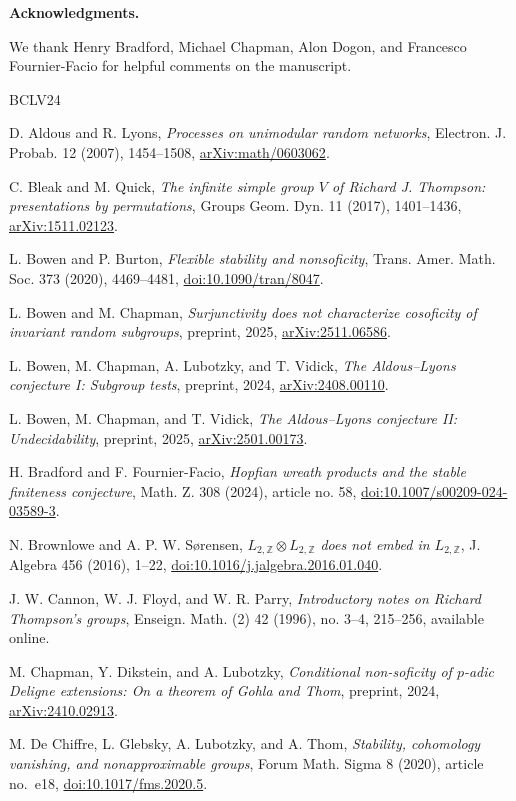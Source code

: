 \documentclass[10pt]{article}
\newcommand{\Z}{\mathbb{Z}}
\newcommand{\subhead}[1]{\par\medskip\noindent\textbf{#1}\par\smallskip}
\begin{document}
\subhead{Acknowledgments.}
We thank Henry Bradford, Michael Chapman, Alon Dogon, and Francesco Fournier-Facio for helpful comments on the manuscript.

\begin{thebibliography}{BCLV24}

D. Aldous and R. Lyons, \emph{Processes on unimodular random networks}, Electron. J. Probab. 12 (2007), 1454--1508, \url{arXiv:math/0603062}.

C. Bleak and M. Quick, \emph{The infinite simple group $V$ of Richard J. Thompson: presentations by permutations}, Groups Geom. Dyn. 11 (2017), 1401--1436, \url{arXiv:1511.02123}.

L. Bowen and P. Burton, \emph{Flexible stability and nonsoficity}, Trans. Amer. Math. Soc. 373 (2020), 4469--4481, \url{doi:10.1090/tran/8047}.

L. Bowen and M. Chapman, \emph{Surjunctivity does not characterize cosoficity of invariant random subgroups}, preprint, 2025, \url{arXiv:2511.06586}.

L. Bowen, M. Chapman, A. Lubotzky, and T. Vidick, \emph{The Aldous--Lyons conjecture I: Subgroup tests}, preprint, 2024, \url{arXiv:2408.00110}.

L. Bowen, M. Chapman, and T. Vidick, \emph{The Aldous--Lyons conjecture II: Undecidability}, preprint, 2025, \url{arXiv:2501.00173}.

H. Bradford and F. Fournier-Facio, \emph{Hopfian wreath products and the stable finiteness conjecture}, Math. Z. 308 (2024), article no. 58, \url{doi:10.1007/s00209-024-03589-3}.

N. Brownlowe and A. P. W. Sørensen, \emph{$L_{2,\Z}\otimes L_{2,\Z}$ does not embed in $L_{2,\Z}$}, J. Algebra 456 (2016), 1--22, \url{doi:10.1016/j.jalgebra.2016.01.040}.

J. W. Cannon, W. J. Floyd, and W. R. Parry, \emph{Introductory notes on Richard Thompson's groups}, Enseign. Math. (2) 42 (1996), no. 3--4, 215--256, available online.

M. Chapman, Y. Dikstein, and A. Lubotzky, \emph{Conditional non-soficity of $p$-adic Deligne extensions: On a theorem of Gohla and Thom}, preprint, 2024, \url{arXiv:2410.02913}.

M. De Chiffre, L. Glebsky, A. Lubotzky, and A. Thom, \emph{Stability, cohomology vanishing, and nonapproximable groups}, Forum Math. Sigma 8 (2020), article no.~e18, \url{doi:10.1017/fms.2020.5}.


\end{thebibliography}
\end{document}
